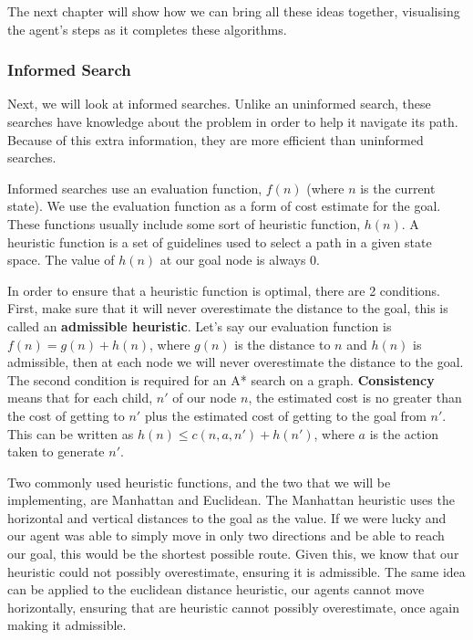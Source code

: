 \documentclass[]{final_report}
\begin{document}
The next chapter will show how we can bring all these ideas together, visualising the agent's steps as it completes these algorithms.

\subsubsection{\Large{Informed Search}}\label{Infomred searches}

Next, we will look at informed searches. Unlike an uninformed search, these searches have knowledge about the problem in order to help it navigate its path. Because of this extra information, they are more efficient than uninformed searches.

Informed searches use an evaluation function, $f(n)$ (where $n$ is the current state). We use the evaluation function as a form of cost estimate for the goal. These functions usually include some sort of heuristic function, $h(n)$. A heuristic function is a set of guidelines used to select a path in a given state space\cite{kapi2020review}. The value of $h(n)$ at our goal node is always 0.

In order to ensure that a heuristic function is optimal, there are 2 conditions. First, make sure that it will never overestimate the distance to the goal, this is called an \textbf{admissible heuristic}. Let's say our evaluation function is $f(n) = g(n) + h(n)$, where $g(n)$ is the distance to $n$ and $h(n)$ is admissible, then at each node we will never overestimate the distance to the goal. The second condition is required for an A* search on a graph. \textbf{Consistency} means that for each child, $n'$ of our node $n$, the estimated cost is no greater than the cost of getting to $n'$ plus the estimated cost of getting to the goal from $n'$. This can be written as $h(n) \le c(n, a, n') + h(n')$, where $a$ is the action taken to generate $n'$.\cite{russell2016artificial}  

Two commonly used heuristic functions, and the two that we will be implementing, are Manhattan and Euclidean. The Manhattan heuristic uses the horizontal and vertical distances to the goal as the value. If we were lucky and our agent was able to simply move in only two directions and be able to reach our goal, this would be the shortest possible route. Given this, we know that our heuristic could not possibly overestimate, ensuring it is admissible. The same idea can be applied to the euclidean distance heuristic, our agents cannot move horizontally, ensuring that are heuristic cannot possibly overestimate, once again making it admissible.
\end{document}
